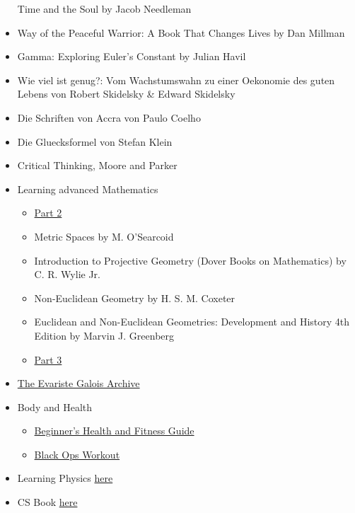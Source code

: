\begin{itemize}
  Time and the Soul by Jacob Needleman
\item
  Way of the Peaceful Warrior: A Book That Changes Lives by Dan Millman
\item
  Gamma: Exploring Euler's Constant by Julian Havil
\item
  Wie viel ist genug?: Vom Wachstumswahn zu einer Oekonomie des guten
  Lebens von Robert Skidelsky \& Edward Skidelsky
\item
  Die Schriften von Accra von Paulo Coelho
\item
  Die Gluecksformel von Stefan Klein
\item
  Critical Thinking, Moore and Parker
\item
  Learning advanced Mathematics

  \begin{itemize}

  \item
    \href{https://www.quantstart.com/articles/How-to-Learn-Advanced-Mathematics-Without-Heading-to-University-Part-2}{Part
    2}

\item Metric Spaces by M. O'Searcoid

\item Introduction to Projective Geometry (Dover Books on Mathematics) by C. R. Wylie Jr.

\item Non-Euclidean Geometry by H. S. M. Coxeter

\item Euclidean and Non-Euclidean Geometries: Development and History 4th Edition by Marvin J. Greenberg

  \item
    \href{https://www.quantstart.com/articles/How-to-Learn-Advanced-Mathematics-Without-Heading-to-University-Part-3}{Part
    3}
    \end{itemize}
    
\item
  \href{http://www.galois-group.net/g/EN/theory.html}{The Evariste
  Galois Archive}
\item
  Body and Health

  \begin{itemize}
  \item
    \href{http://liamrosen.com/fitness.html}{Beginner's Health and
    Fitness Guide}
  \item
    \href{http://darebee.com/workouts/black-ops-workout.html}{Black Ops
    Workout}
  \end{itemize}
\item
  Learning Physics
  \href{http://www.susanjfowler.com/blog/2016/8/13/so-you-want-to-learn-physics}{here}
\item
  CS Book \href{http://danluu.com/programming-books/}{here}
\end{itemize}
